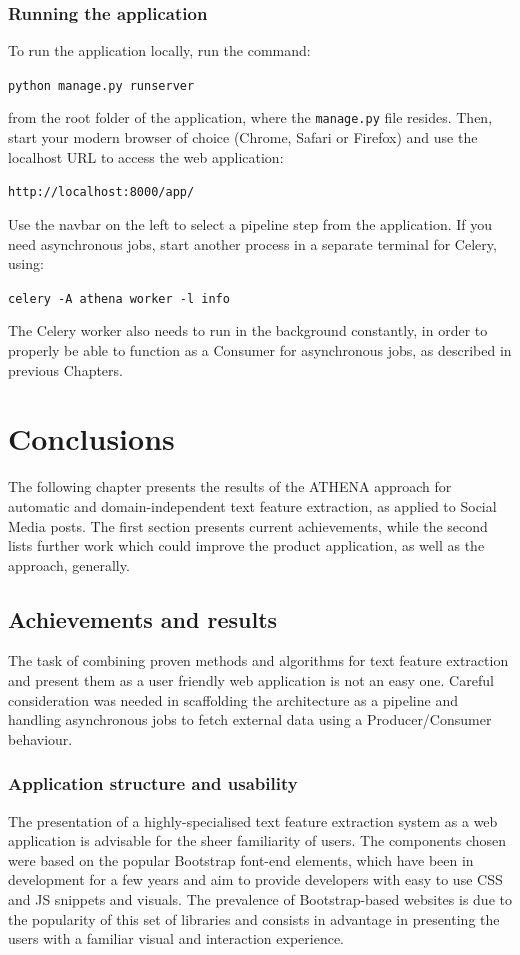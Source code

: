 \documentclass[12pt,a4paper,twoside]{report}
\begin{document}
\subsection*{Running the application}
To run the application locally, run the command:

\texttt{python manage.py runserver}

from the root folder of the application, where the \texttt{manage.py} file resides. Then, start your modern browser of choice (Chrome, Safari or Firefox) and use the localhost URL to access the web application:

\texttt{http://localhost:8000/app/}

Use the navbar on the left to select a pipeline step from the application. If you need asynchronous jobs, start another process in a separate terminal for Celery, using:

\texttt{celery -A athena worker -l info}

The Celery worker also needs to run in the background constantly, in order to properly be able to function as a Consumer for asynchronous jobs, as described in previous Chapters.

\chapter{Conclusions}
The following chapter presents the results of the ATHENA approach for automatic and domain-independent text feature extraction, as applied to Social Media posts. The first section presents current achievements, while the second lists further work which could improve the product application, as well as the approach, generally.

\section{Achievements and results}
The task of combining proven methods and algorithms for text feature extraction and present them as a user friendly web application is not an easy one. Careful consideration was needed in scaffolding the architecture as a pipeline and handling asynchronous jobs to fetch external data using a Producer/Consumer behaviour.

\subsection{Application structure and usability}
The presentation of a highly-specialised text feature extraction system as a web application is advisable for the sheer familiarity of users. The components chosen were based on the popular Bootstrap font-end elements, which have been in development for a few years and aim to provide developers with easy to use CSS and JS snippets and visuals. The prevalence of Bootstrap-based websites is due to the popularity of this set of libraries and consists in advantage in presenting the users with a familiar visual and interaction experience.
\end{document}
